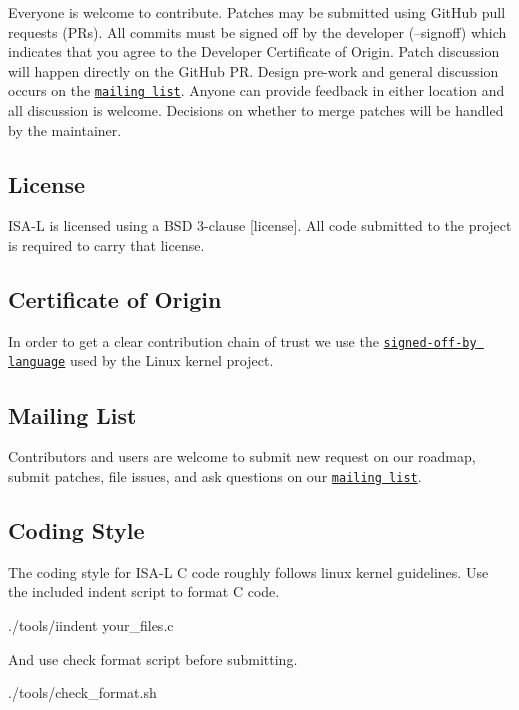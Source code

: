 Everyone is welcome to contribute. Patches may be submitted using Git\-Hub pull requests (P\-Rs). All commits must be signed off by the developer (--signoff) which indicates that you agree to the Developer Certificate of Origin. Patch discussion will happen directly on the Git\-Hub P\-R. Design pre-\/work and general discussion occurs on the \href{https://lists.01.org/hyperkitty/list/isal@lists.01.org/}{\tt mailing list}. Anyone can provide feedback in either location and all discussion is welcome. Decisions on whether to merge patches will be handled by the maintainer.

\subsection*{License}

I\-S\-A-\/\-L is licensed using a B\-S\-D 3-\/clause \mbox{[}license\mbox{]}. All code submitted to the project is required to carry that license.

\subsection*{Certificate of Origin}

In order to get a clear contribution chain of trust we use the \href{https://01.org/community/signed-process}{\tt signed-\/off-\/by language} used by the Linux kernel project.

\subsection*{Mailing List}

Contributors and users are welcome to submit new request on our roadmap, submit patches, file issues, and ask questions on our \href{https://lists.01.org/hyperkitty/list/isal@lists.01.org/}{\tt mailing list}.

\subsection*{Coding Style}

The coding style for I\-S\-A-\/\-L C code roughly follows linux kernel guidelines. Use the included indent script to format C code. \begin{DoxyVerb}./tools/iindent your_files.c
\end{DoxyVerb}


And use check format script before submitting. \begin{DoxyVerb}./tools/check_format.sh
\end{DoxyVerb}
 